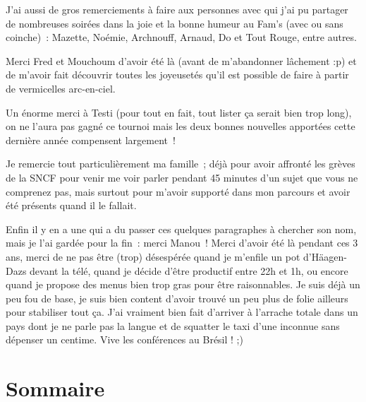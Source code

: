 J'ai aussi de gros remerciements à faire aux personnes avec qui j'ai pu partager de nombreuses soirées dans la joie et la bonne humeur au Fam's (avec ou sans coinche)~: Mazette, Noémie, Archnouff, Arnaud, Do et Tout Rouge, entre autres.

Merci Fred et Mouchoum d'avoir été là (avant de m'abandonner lâchement :p) et de m'avoir fait découvrir toutes les joyeusetés qu'il est possible de faire à partir de vermicelles arc-en-ciel.

Un énorme merci à Testi (pour tout en fait, tout lister ça serait bien trop long), on ne l'aura pas gagné ce tournoi mais les deux bonnes nouvelles apportées cette dernière année compensent largement~!


Je remercie tout particulièrement ma famille~; déjà pour avoir affronté les grèves de la SNCF pour venir me voir parler pendant 45 minutes d'un sujet que vous ne comprenez pas, mais surtout pour m'avoir supporté dans mon parcours et avoir été présents quand il le fallait.


Enfin il y en a une qui a du passer ces quelques paragraphes à chercher son nom, mais je l'ai gardée pour la fin~: merci Manou~!
Merci d'avoir été là pendant ces 3 ans, merci de ne pas être (trop) désespérée quand je m'enfile un pot d'Häagen-Dazs devant la télé, quand je décide d'être productif entre 22h et 1h, ou encore quand je propose des menus bien trop gras pour être raisonnables.
Je suis déjà un peu fou de base, je suis bien content d'avoir trouvé un peu plus de folie ailleurs pour stabiliser tout ça.
J'ai vraiment bien fait d'arriver à l'arrache totale dans un pays dont je ne parle pas la langue et de squatter le taxi d'une inconnue sans dépenser un centime.
Vive les conférences au Brésil ! ;)

\cleardoublepage
\dominitoc
\makeatletter
\renewcommand{\contentsname}{Sommaire}
\renewcommand{\tableofcontents}[1][\contentsname]{%
  \chapter*{#1}
}
\makeatother
\tableofcontents
